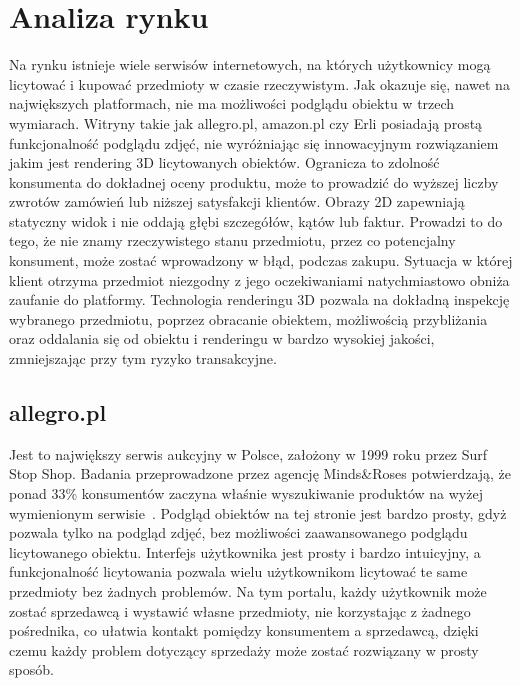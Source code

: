 \section{Analiza rynku}

Na rynku istnieje wiele serwisów internetowych, na których użytkownicy mogą licytować i kupować przedmioty w czasie rzeczywistym. Jak okazuje się, nawet na największych platformach, nie ma możliwości podglądu obiektu w trzech wymiarach. Witryny takie jak allegro.pl, amazon.pl czy Erli posiadają prostą funkcjonalność podglądu zdjęć, nie wyróżniając się innowacyjnym rozwiązaniem jakim jest rendering 3D licytowanych obiektów. Ogranicza to zdolność konsumenta do dokładnej oceny produktu, może to prowadzić do wyższej liczby zwrotów zamówień lub niższej satysfakcji klientów. Obrazy 2D zapewniają statyczny widok i nie oddają głębi szczegółów, kątów lub faktur. Prowadzi to do tego, że nie znamy rzeczywistego stanu przedmiotu, przez co potencjalny konsument, może zostać wprowadzony w błąd, podczas zakupu.  Sytuacja w której klient otrzyma przedmiot niezgodny z jego oczekiwaniami natychmiastowo obniża zaufanie do platformy. Technologia renderingu 3D pozwala na dokładną inspekcję wybranego przedmiotu, poprzez obracanie obiektem, możliwością przybliżania oraz oddalania się od obiektu i renderingu w bardzo wysokiej jakości, zmniejszając przy tym ryzyko transakcyjne.

\subsection{allegro.pl}
Jest to największy serwis aukcyjny w Polsce, założony w 1999 roku przez Surf Stop Shop. Badania przeprowadzone przez agencję Minds\&Roses potwierdzają, że ponad 33\% konsumentów zaczyna właśnie wyszukiwanie produktów na wyżej wymienionym serwisie~\cite{wywiad-dyrektor-allegro}. Podgląd obiektów na tej stronie jest bardzo prosty, gdyż pozwala tylko na podgląd zdjęć, bez możliwości zaawansowanego podglądu licytowanego obiektu. Interfejs użytkownika jest prosty i bardzo intuicyjny, a funkcjonalność licytowania pozwala wielu użytkownikom licytować te same przedmioty bez żadnych problemów. Na tym portalu, każdy użytkownik może zostać sprzedawcą i wystawić własne przedmioty, nie korzystając z żadnego pośrednika, co ułatwia kontakt pomiędzy konsumentem a sprzedawcą, dzięki czemu każdy problem dotyczący sprzedaży może zostać rozwiązany w prosty sposób.


